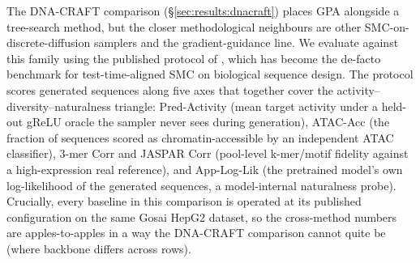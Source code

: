 \documentclass{article}
\theoremstyle{definition}
\theoremstyle{remark}
\newcommand{\gpa}{\textsc{GPA}\xspace}
\newcommand{\dnacraft}{\textsc{DNA-CRAFT}\xspace}
\begin{document}
The \dnacraft{} comparison (\S\ref{sec:results:dnacraft}) places \gpa{} alongside a tree-search method, but the closer methodological neighbours are other SMC-on-discrete-diffusion samplers and the gradient-guidance line. We evaluate against this family using the published protocol of \citet{paniouli2025}, which has become the de-facto benchmark for test-time-aligned SMC on biological sequence design. The protocol scores generated sequences along five axes that together cover the activity–diversity–naturalness triangle: Pred-Activity (mean target activity under a held-out gReLU oracle the sampler never sees during generation), ATAC-Acc (the fraction of sequences scored as chromatin-accessible by an independent ATAC classifier), 3-mer Corr and JASPAR Corr (pool-level k-mer/motif fidelity against a high-expression real reference), and App-Log-Lik (the pretrained model's own log-likelihood of the generated sequences, a model-internal naturalness probe). Crucially, every baseline in this comparison is operated at its published configuration on the same Gosai HepG2 dataset, so the cross-method numbers are apples-to-apples in a way the \dnacraft{} comparison cannot quite be (where backbone differs across rows).
\end{document}
